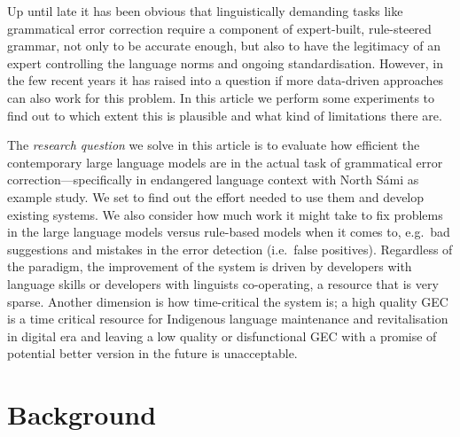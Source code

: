 \documentclass[free]{flammie}
\begin{document}
Up until late it has been obvious that linguistically demanding tasks like
grammatical error correction require a component of expert-built, rule-steered
grammar, not only to be accurate enough, but also to have the legitimacy of an
expert controlling the language norms and ongoing standardisation.  However, in
the few recent years it has raised into a question if more data-driven
approaches can also work for this problem.  In this article we perform some
experiments to find out to which extent this is plausible and what kind of
limitations there are.

The \textit{research question} we solve in this article is to evaluate how
efficient the contemporary large language models are in the actual task of
grammatical error correction---specifically in endangered language context with
North Sámi as example study. We set to find out the effort needed to
use them and develop existing systems. We also consider how much work it might
take to fix problems in the large language models versus rule-based models when
it comes to, e.g.\ bad suggestions and mistakes in the error detection (i.e.\
false positives).  Regardless of the paradigm, the improvement of the system is
driven by developers with language skills or developers with linguists
co-operating, a resource that is very sparse. Another dimension is how
time-critical the system is; a high quality GEC is a time critical resource for
Indigenous language maintenance and revitalisation in digital era and leaving a
low quality or disfunctional GEC with a promise of potential better version in
the future is unacceptable.

\section{Background}
\end{document}
